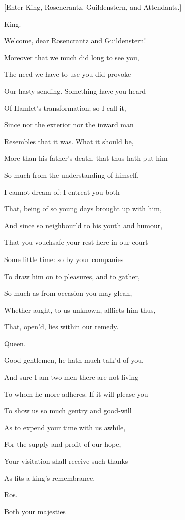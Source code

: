 \documentclass[12pt]{book}
\begin{document}
[Enter King, Rosencrantz, Guildenstern, and Attendants.]



King.

Welcome, dear Rosencrantz and Guildenstern!

Moreover that we much did long to see you,

The need we have to use you did provoke

Our hasty sending. Something have you heard

Of Hamlet's transformation; so I call it,

Since nor the exterior nor the inward man

Resembles that it was. What it should be,

More than his father's death, that thus hath put him

So much from the understanding of himself,

I cannot dream of: I entreat you both

That, being of so young days brought up with him,

And since so neighbour'd to his youth and humour,

That you vouchsafe your rest here in our court

Some little time: so by your companies

To draw him on to pleasures, and to gather,

So much as from occasion you may glean,

Whether aught, to us unknown, afflicts him thus,

That, open'd, lies within our remedy.



Queen.

Good gentlemen, he hath much talk'd of you,

And sure I am two men there are not living

To whom he more adheres. If it will please you

To show us so much gentry and good-will

As to expend your time with us awhile,

For the supply and profit of our hope,

Your visitation shall receive such thanks

As fits a king's remembrance.



Ros.

Both your majesties
\end{document}
